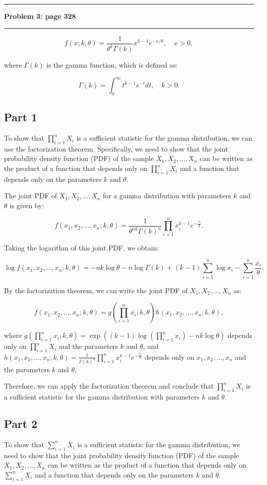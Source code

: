 \documentclass[11pt]{article}
\newcommand\question[2]{\vspace{.25in}\hrule\textbf{#1: #2}\vspace{.5em}\hrule\vspace{.10in}}
\begin{document}
\question{Problem 3}{page 328}

$$ f(x; k,\theta) = \frac{1}{\theta^k\Gamma(k)} x^{k-1} e^{-x/\theta}, \quad x > 0, $$

where $\Gamma(k)$ is the gamma function, which is defined as:

$$ \Gamma(k) = \int_0^\infty t^{k-1} e^{-t} dt, \quad k > 0. $$

\subsection*{Part 1}
To show that $\prod_{i=1}^{n} X_i$ is a sufficient statistic for the gamma distribution, we can use the factorization theorem. Specifically, we need to show that the joint probability density function (PDF) of the sample $X_1, X_2, \ldots, X_n$ can be written as the product of a function that depends only on $\prod_{i=1}^{n} X_i$ and a function that depends only on the parameters $k$ and $\theta$.

The joint PDF of $X_1, X_2, \ldots, X_n$ for a gamma distribution with parameters $k$ and $\theta$ is given by:

$$ f(x_1,x_2,\ldots,x_n;k,\theta) = \frac{1}{\theta^{nk}\Gamma(k)^n} \prod_{i=1}^{n} x_i^{k-1} e^{-\frac{x_i}{\theta}}. $$

Taking the logarithm of this joint PDF, we obtain:

$$ \log f(x_1,x_2,\ldots,x_n;k,\theta) = -nk\log\theta - n\log\Gamma(k) + (k-1)\sum_{i=1}^{n} \log x_i - \sum_{i=1}^{n} \frac{x_i}{\theta}. $$

By the factorization theorem, we can write the joint PDF of $X_1, X_2, \ldots, X_n$ as:

$$ f(x_1,x_2,\ldots,x_n;k,\theta) = g\left(\prod_{i=1}^{n} x_i; k, \theta\right)h(x_1,x_2,\ldots,x_n;k,\theta), $$

where $g\left(\prod_{i=1}^{n} x_i; k, \theta\right) = \exp\left((k-1)\log\left(\prod_{i=1}^{n} x_i\right)-nk\log\theta\right)$ depends only on $\prod_{i=1}^{n} X_i$ and the parameters $k$ and $\theta$, and $h(x_1,x_2,\ldots,x_n;k,\theta) = \frac{1}{\Gamma(k)^n} \prod_{i=1}^{n} x_i^{k-1} e^{-\frac{x_i}{\theta}}$ depends only on $x_1,x_2,\ldots,x_n$ and the parameters $k$ and $\theta$.

Therefore, we can apply the factorization theorem and conclude that $\prod_{i=1}^{n} X_i$ is a sufficient statistic for the gamma distribution with parameters $k$ and $\theta$.
\subsection*{Part 2}
To show that $\sum_{i=1}^{n} X_i$ is a sufficient statistic for the gamma distribution, we need to show that the joint probability density function (PDF) of the sample $X_1, X_2, \ldots, X_n$ can be written as the product of a function that depends only on $\sum_{i=1}^{n} X_i$ and a function that depends only on the parameters $k$ and $\theta$.
\end{document}
